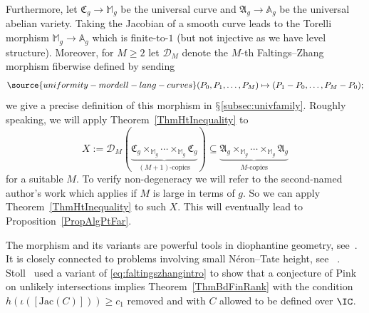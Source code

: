 Furthermore, let
$\mathfrak{C}_g \rightarrow \mathbb{M}_g$ be the universal curve and
$\mathfrak{A}_g \rightarrow \mathbb A_g$ be the universal abelian
variety. Taking the Jacobian of a smooth curve leads to the  Torelli morphism
$\mathbb{M}_g \rightarrow \mathbb A_g$ which is finite-to-$1$  (but
 not injective  as we
have level structure).
Moreover, for $M\ge 2$ let
$\mathscr{D}_M$ denote the $M$-th Faltings--Zhang morphism fiberwise defined by
sending
\begin{equation}
  \label{eq:faltingszhangintro}
\source{uniformity-mordell-lang-curves}
  (P_0, P_1, \ldots, P_M) \mapsto (P_1-P_0, \ldots, P_M-P_0);
\end{equation}
we give a precise definition of this morphism
in $\mathsection$\ref{subsec:univfamily}.
Roughly speaking, we will  apply Theorem~\ref{ThmHtInequality} to
\[
  X := \mathscr{D}_M(\underbrace{\mathfrak{C}_g \times_{\mathbb{M}_g} \cdots \times_{\mathbb{M}_g} \mathfrak{C}_g}_{(M+1)\text{-copies}}) \subseteq \underbrace{\mathfrak{A}_g \times_{\mathbb M_g} \cdots \times_{\mathbb M_g} \mathfrak{A}_g}_{M\text{-copies}}
\]
for
a suitable  $M$. To verify non-degeneracy we will refer to
the second-named author's work \cite[Theorem~1.2']{GaoBettiRank} which
applies if $M$ is large in terms of $g$.  So we can apply Theorem~\ref{ThmHtInequality} to such $X$.  This
will eventually lead to Proposition~\ref{PropAlgPtFar}. %

The morphism and its variants are powerful tools in diophantine
geometry, see~\cite[Lemma~4.1]{Faltings:DAAV}. It is closely connected
to problems involving small N\'eron--Tate height,
see~\cite[Lemma~3.1]{ZhangEquidist}%
. Stoll~\cite{Stoll:Uniform} used a
variant of \eqref{eq:faltingszhangintro} to show that a conjecture of
Pink~\cite{Pink} on unlikely intersections implies
Theorem~\ref{ThmBdFinRank} with the condition
$h(\iota([\mathrm{Jac}(C)])) \ge c_1$ removed and with $C$ allowed to
be defined over $\IC$.

